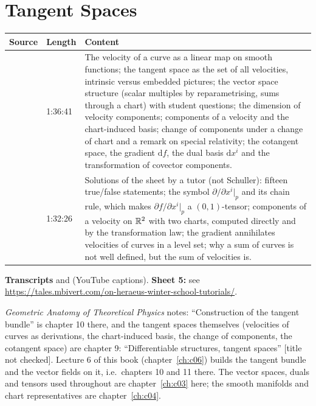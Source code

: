 \chapter{Tangent Spaces}\label{ch:c05}
\begin{paracol}{2}

\begin{sources}
\begin{tabularx}{\linewidth}{@{}l l L@{}}
\toprule
\textbf{Source} & \textbf{Length} & \textbf{Content}\\
\midrule
{} & 1:36:41 & The velocity of a curve as a linear map on smooth functions; the tangent space as the set of all velocities, intrinsic versus embedded pictures; the vector space structure (scalar multiples by reparametrising, sums through a chart) with student questions;
the dimension of velocity components; components of a velocity and the chart-induced basis; change of components under a change of chart and a remark on special relativity; the cotangent space, the gradient $\mathrm df$, the dual basis $\mathrm dx^i$ and the transformation of covector components.\\
 & 1:32:26 & Solutions of the sheet by a tutor (not Schuller): fifteen true/false statements; the symbol $\partial/\partial x^i|_p$ and its chain rule, which makes $\partial f/\partial x^i|_p$ a $(0,1)$-tensor; components of a velocity on $\mathbb{R}^2$ with two charts, computed directly and by the transformation law;
the gradient annihilates velocities of curves in a level set; why a sum of curves is not well defined, but the sum of velocities is.\\
\bottomrule
\end{tabularx}

\smallskip
\textbf{Transcripts}  and  (YouTube captions).
\textbf{Sheet 5:} see \url{https://tales.mbivert.com/on-heraeus-winter-school-tutorials/}.
\end{sources}

\begin{reading}
\emph{Geometric Anatomy of Theoretical Physics} notes: ``Construction of the tangent bundle'' is chapter 10 there, and the tangent spaces themselves (velocities of curves as derivations, the chart-induced basis,
the change of components, the cotangent space) are chapter 9: ``Differentiable structures, tangent spaces'' [title not checked]. Lecture 6 of this book (chapter~\ref{ch:c06}) builds the tangent bundle and the vector fields on it, i.e.\ chapters 10 and 11 there. The vector spaces, duals
and tensors used throughout are chapter~\ref{ch:c03} here; the smooth manifolds and chart representatives are chapter~\ref{ch:c04}.
\end{reading}


\end{paracol}
